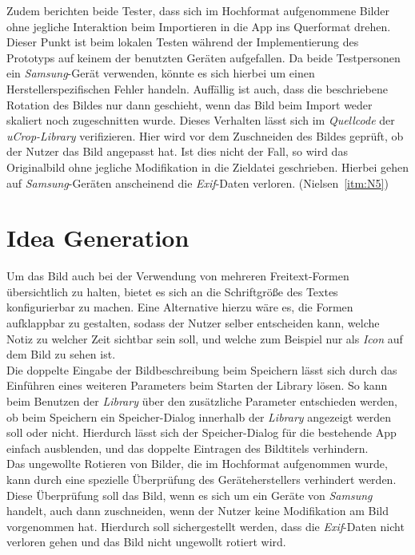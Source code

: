 Zudem berichten beide Tester, dass sich im Hochformat aufgenommene Bilder ohne jegliche Interaktion beim Importieren in die App ins Querformat drehen.
Dieser Punkt ist beim lokalen Testen während der Implementierung des Prototyps auf keinem der benutzten Geräten aufgefallen.
Da beide Testpersonen ein \emph{Samsung}-Gerät verwenden, könnte es sich hierbei um einen Herstellerspezifischen Fehler handeln.
Auffällig ist auch, dass die beschriebene Rotation des Bildes nur dann geschieht, wenn das Bild beim Import weder skaliert noch zugeschnitten wurde.
Dieses Verhalten lässt sich im \emph{Quellcode} der \emph{uCrop-Library} verifizieren.
Hier wird vor dem Zuschneiden des Bildes geprüft, ob der Nutzer das Bild angepasst hat.
Ist dies nicht der Fall, so wird das Originalbild ohne jegliche Modifikation in die Zieldatei geschrieben.
Hierbei gehen auf \emph{Samsung}-Geräten anscheinend die \emph{Exif}-Daten verloren.
(Nielsen~\autoref{itm:N5}) \\ 

\section{Idea Generation}\label{sec:idea4}
Um das Bild auch bei der Verwendung von mehreren Freitext-Formen übersichtlich zu halten, bietet es sich an die Schriftgröße des Textes konfigurierbar zu machen.
Eine Alternative hierzu wäre es, die Formen aufklappbar zu gestalten, sodass der Nutzer selber entscheiden kann, welche Notiz zu welcher Zeit sichtbar sein soll, und welche zum Beispiel nur als \emph{Icon} auf dem Bild zu sehen ist. \\

Die doppelte Eingabe der Bildbeschreibung beim Speichern lässt sich durch das Einführen eines weiteren Parameters beim Starten der Library lösen.
So kann beim Benutzen der \emph{Library} über den zusätzliche Parameter entschieden werden, ob beim Speichern ein Speicher-Dialog innerhalb der \emph{Library} angezeigt werden soll oder nicht.
Hierdurch lässt sich der Speicher-Dialog für die bestehende App einfach ausblenden, und das doppelte Eintragen des Bildtitels verhindern. \\

Das ungewollte Rotieren von Bilder, die im Hochformat aufgenommen wurde, kann durch eine spezielle Überprüfung des Geräteherstellers verhindert werden.
Diese Überprüfung soll das Bild, wenn es sich um ein Geräte von \emph{Samsung} handelt, auch dann zuschneiden, wenn der Nutzer keine Modifikation am Bild vorgenommen hat.
Hierdurch soll sichergestellt werden, dass die \emph{Exif}-Daten nicht verloren gehen und das Bild nicht ungewollt rotiert wird.

